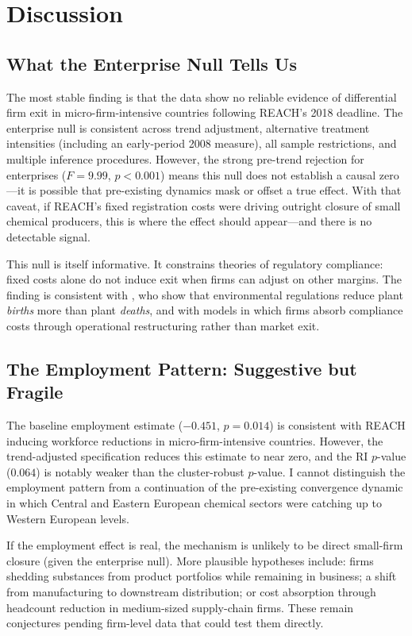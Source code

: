 \documentclass[12pt]{article}
\begin{document}
\section{Discussion}
\label{sec:discussion}

\subsection{What the Enterprise Null Tells Us}

The most stable finding is that the data show no reliable evidence of differential firm exit in micro-firm-intensive countries following REACH's 2018 deadline. The enterprise null is consistent across trend adjustment, alternative treatment intensities (including an early-period 2008 measure), all sample restrictions, and multiple inference procedures. However, the strong pre-trend rejection for enterprises ($F = 9.99$, $p < 0.001$) means this null does not establish a causal zero---it is possible that pre-existing dynamics mask or offset a true effect. With that caveat, if REACH's fixed registration costs were driving outright closure of small chemical producers, this is where the effect should appear---and there is no detectable signal.

This null is itself informative. It constrains theories of regulatory compliance: fixed costs alone do not induce exit when firms can adjust on other margins. The finding is consistent with \citet{becker2000}, who show that environmental regulations reduce plant \textit{births} more than plant \textit{deaths}, and with models in which firms absorb compliance costs through operational restructuring rather than market exit.

\subsection{The Employment Pattern: Suggestive but Fragile}

The baseline employment estimate ($-0.451$, $p = 0.014$) is consistent with REACH inducing workforce reductions in micro-firm-intensive countries. However, the trend-adjusted specification reduces this estimate to near zero, and the RI $p$-value ($0.064$) is notably weaker than the cluster-robust $p$-value. I cannot distinguish the employment pattern from a continuation of the pre-existing convergence dynamic in which Central and Eastern European chemical sectors were catching up to Western European levels.

If the employment effect is real, the mechanism is unlikely to be direct small-firm closure (given the enterprise null). More plausible hypotheses include: firms shedding substances from product portfolios while remaining in business; a shift from manufacturing to downstream distribution; or cost absorption through headcount reduction in medium-sized supply-chain firms. These remain conjectures pending firm-level data that could test them directly.
\end{document}

